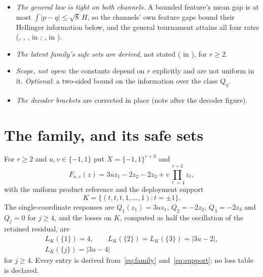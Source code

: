 \begin{itemize}
test hypothesis of the upper law with the Hellinger information (,
, , ,
 in ).
\item \emph{The general law is tight on both channels.} A bounded feature's mean gap is at most
$\int|p-q|\le\sqrt8\,H$, so the channels' own feature gaps bound their Hellinger information
below, and the general tournament attains all four rates (,
, ,  in
; ,
 in ).
\item \emph{The latent family's safe sets are derived}, not stated ( in
), for $r\ge2$.
\item \emph{Scope, not open}: the constants depend on $r$ explicitly and are not uniform in it.
\emph{Optional}: a two-sided bound on the information over the class $Q_{\eta}$.
\item \emph{The decoder brackets} are corrected in place (note after the decoder figure).
\end{itemize}

\section{The family, and its safe sets}
\label{sec:family}

For $r\ge2$ and $u,v\in\{-1,1\}$ put $X=\{-1,1\}^{r+3}$ and
\begin{equation}
F_{u,v}(z)=3u z_{1}-2z_{2}-2z_{3}+v\prod_{\ell=4}^{r+3}z_{\ell},
\label{eq:family}
\end{equation}
with the uniform product reference and the deployment support
\begin{equation}
K=\bigl\{(t,t,t,1,\dots,1):t=\pm1\bigr\}.
\label{eq:support}
\end{equation}
The single-coordinate responses are $Q_{1}(z_{1})=3uz_{1}$, $Q_{2}=-2z_{2}$, $Q_{3}=-2z_{3}$
and $Q_{j}=0$ for $j\ge4$, and the losses on $K$, computed as half the oscillation of the
retained residual, are
\begin{equation}
\begin{gathered}
L_{K}(\{1\})=4,\qquad L_{K}(\{2\})=L_{K}(\{3\})=|3u-2|,\\
L_{K}(\{j\})=|3u-4|
\end{gathered}
\label{eq:losses}
\end{equation}
for $j\ge4$. Every entry is derived from~\eqref{eq:family} and~\eqref{eq:support}; no loss
table is declared. \CERT{}

